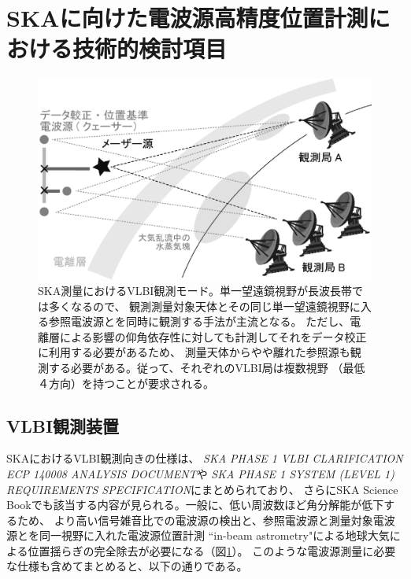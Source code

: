 \setcounter{section}{1}\section{SKAに向けた電波源高精度位置計測における技術的検討項目}\label{c7.s2}

\begin{figure}[t]
\begin{center}
\includegraphics[width=0.7\linewidth]{astrometry/VLBI_calibration.eps}
\end{center}
\caption{SKA測量におけるVLBI観測モード。単一望遠鏡視野が長波長帯では多くなるので、
観測測量対象天体とその同じ単一望遠鏡視野に入る参照電波源とを同時に観測する手法が主流となる。
ただし、電離層による影響の仰角依存性に対しても計測してそれをデータ校正に利用する必要があるため、
測量天体からやや離れた参照源も観測する必要がある。従って、それぞれのVLBI局は複数視野
（最低４方向）を持つことが要求される。}\label{c7.s2.f3}
\end{figure}

\setcounter{subsection}{0}\subsection{VLBI観測装置}\label{c7.s2.ss1}
SKAにおけるVLBI観測向きの仕様は、
{\it SKA PHASE 1 VLBI CLARIFICATION ECP 140008 ANALYSIS DOCUMENT}\citep{SKA-VLBI}や
{\it SKA PHASE 1 SYSTEM (LEVEL 1) REQUIREMENTS SPECIFICATION}\citep{SKA1-requirement}にまとめられており、
さらにSKA Science Bookでも該当する内容が見られる\citep{Paragi...2015}。一般に、低い周波数ほど角分解能が低下するため、
より高い信号雑音比での電波源の検出と、参照電波源と測量対象電波源とを同一視野に入れた電波源位置計測
``in-beam astrometry"による地球大気による位置揺らぎの完全除去が必要になる（図\ref{c7.s2.f3}）。
このような電波源測量に必要な仕様も含めてまとめると、以下の通りである。

